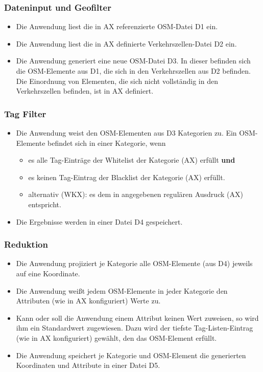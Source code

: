 \documentclass[parskip=full]{scrartcl} %
\begin{document}
\subsubsection*{Dateninput und Geofilter}
\begin{itemize}
    \item Die Anwendung liest die in AX referenzierte OSM-Datei D1 ein.
    \item Die Anwendung liest die in AX definierte Verkehrszellen-Datei D2 ein.
    \item Die Anwendung generiert eine neue OSM-Datei D3. In dieser befinden sich die OSM-Elemente aus D1, die sich in den Verkehrszellen aus D2 befinden. Die Einordnung von Elementen, die sich nicht vollständig in den Verkehrszellen befinden, ist in AX definiert.
\end{itemize}


\subsubsection*{Tag Filter}
\begin{itemize}
    \item Die Anwendung weist den OSM-Elementen aus D3 Kategorien zu. Ein OSM-Elemente befindet sich in einer Kategorie, wenn
    \begin{itemize}
        \item es alle Tag-Einträge der Whitelist der Kategorie (AX) erfüllt \textbf{und}
        \item es keinen Tag-Eintrag der Blacklist der Kategorie (AX) erfüllt.
        \item alternativ (WKX): es dem in angegebenen regulären Ausdruck (AX) entspricht.
    \end{itemize}
    \item Die Ergebnisse werden in einer Datei D4 gespeichert.
\end{itemize}


\subsubsection*{Reduktion}
\begin{itemize}
    \item Die Anwendung projiziert je Kategorie alle OSM-Elemente (aus D4) jeweils auf eine Koordinate.
    \item Die Anwendung weißt jedem OSM-Elemente in jeder Kategorie den Attributen (wie in AX konfiguriert) Werte zu.
    \item Kann oder soll die Anwendung einem Attribut keinen Wert zuweisen, so wird ihm ein Standardwert zugewiesen. Dazu wird der tiefste Tag-Listen-Eintrag (wie in AX konfiguriert) gewählt, den das OSM-Element erfüllt.
    \item Die Anwendung speichert je Kategorie und OSM-Element die generierten Koordinaten und Attribute in einer Datei D5.
\end{itemize}
\end{document}
